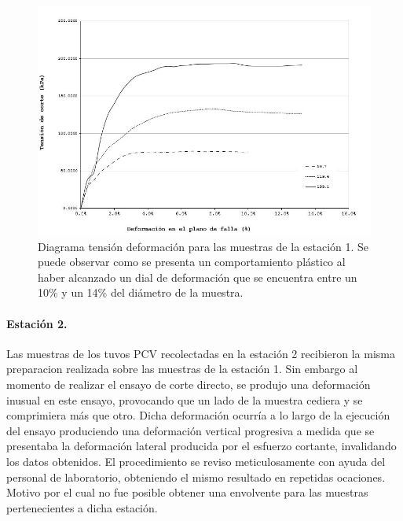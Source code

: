 \begin{figure}[H]
\centering
\includegraphics[scale=1]{img/diagramatd.JPG}
\caption{Diagrama tensi\'on deformaci\'on para las muestras de la estaci\'on 1. Se puede observar como se presenta un comportamiento pl\'astico al haber alcanzado un dial de deformaci\'on que se encuentra entre un   10\% y un 14\% del di\'ametro de la muestra.}
\label{fig:toma-bloque}
\end{figure}


\paragraph{Estaci\'on 2.}
Las muestras de los tuvos PCV recolectadas en la estaci\'on 2 recibieron la misma preparacion realizada sobre las muestras de la estaci\'on 1. Sin embargo al momento de realizar el ensayo de corte directo, se produjo una deformaci\'on inusual en este ensayo, provocando que un lado de la muestra cediera y se comprimiera m\'as que otro. Dicha deformaci\'on ocurr\'ia a lo largo de la ejecuci\'on del ensayo produciendo una deformaci\'on vertical progresiva a medida que se presentaba la deformaci\'on lateral producida por el esfuerzo cortante, invalidando los datos obtenidos. El procedimiento se reviso meticulosamente con ayuda del personal de laboratorio, obteniendo el mismo resultado en repetidas ocaciones. Motivo por el cual no fue posible obtener una envolvente para las muestras pertenecientes a dicha estaci\'on.


